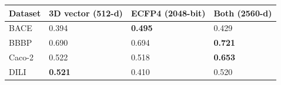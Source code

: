 \begin{tabular}{llll}
\toprule
Dataset & 3D vector (512-d) & ECFP4 (2048-bit) & Both (2560-d) \\
\midrule
BACE & 0.394 & \textbf{0.495} & 0.429 \\
BBBP & 0.690 & 0.694 & \textbf{0.721} \\
Caco-2 & 0.522 & 0.518 & \textbf{0.653} \\
DILI & \textbf{0.521} & 0.410 & 0.520 \\
\bottomrule
\end{tabular}
